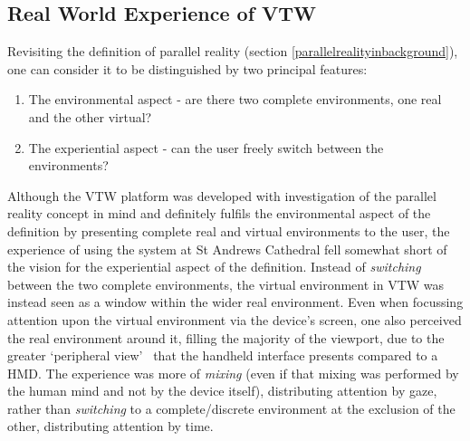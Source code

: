 

\subsection{Real World Experience of VTW}
\label{real-world-experience-of-vtw}


Revisiting the definition of parallel reality (section \ref{parallelrealityinbackground}), one can consider it to be distinguished by two principal features:

\begin{enumerate}
	\item The environmental aspect - are there two complete environments, one real and the other virtual?
	\item The experiential aspect - can the user freely switch between the environments?
\end{enumerate}

Although the VTW platform was developed with investigation of the parallel reality concept in mind and definitely fulfils the environmental aspect of the definition by presenting complete real and virtual environments to the user, the experience of using the system at St Andrews Cathedral fell somewhat short of the vision for the experiential aspect of the definition. Instead of \textit{switching} between the two complete environments, the virtual environment in VTW was instead seen as a window within the wider real environment. Even when focussing attention upon the virtual environment via the device's screen, one also perceived the real environment around it, filling the majority of the viewport, due to the greater `peripheral view'~\cite{Billinghurst2014} that the handheld interface presents compared to a HMD. The experience was more of \textit{mixing} (even if that mixing was performed by the human mind and not by the device itself), distributing attention by gaze, rather than \textit{switching} to a complete/discrete environment at the exclusion of the other, distributing attention by time.

